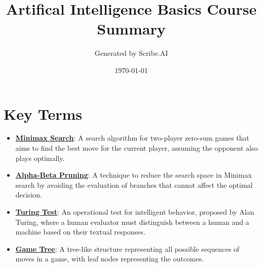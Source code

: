 \documentclass{article}%
\title{Artifical Intelligence Basics Course Summary}%
\author{Generated by Scribe.AI}%
\date{\today}%
\begin{document}
%
\normalsize%
\maketitle%
\section{Key Terms}%
\label{sec:KeyTerms}%
\begin{itemize}[leftmargin=*]%
\item \href{\url{https://purdue.brightspace.com/d2l/common/assets/pdfjs-d2l-dist/1.0.14-legacy/web/viewer.html?file=\%252Fcontent\%252Fenforced\%252F1095467-wl.202510.CS.24300.001\%252F02L2-Intro.pdf\%253Fou\%253D1095467\&lang=en-us\&container=d2l-fileviewer-rendered-pdf\&fullscreen=d2l-fileviewer-rendered-pdf-dialog\&height=667}#page=22}{\textbf{Minimax Search}}: A search algorithm for two-player zero-sum games that aims to find the best move for the current player, assuming the opponent also plays optimally.%
\item \href{\url{https://purdue.brightspace.com/d2l/common/assets/pdfjs-d2l-dist/1.0.14-legacy/web/viewer.html?file=\%252Fcontent\%252Fenforced\%252F1095467-wl.202510.CS.24300.001\%252F02L2-Intro.pdf\%253Fou\%253D1095467\&lang=en-us\&container=d2l-fileviewer-rendered-pdf\&fullscreen=d2l-fileviewer-rendered-pdf-dialog\&height=667}#page=23}{\textbf{Alpha{-}Beta Pruning}}: A technique to reduce the search space in Minimax search by avoiding the evaluation of branches that cannot affect the optimal decision.%
\item \href{\url{https://purdue.brightspace.com/d2l/common/assets/pdfjs-d2l-dist/1.0.14-legacy/web/viewer.html?file=\%252Fcontent\%252Fenforced\%252F1095467-wl.202510.CS.24300.001\%252F02L2-Intro.pdf\%253Fou\%253D1095467\&lang=en-us\&container=d2l-fileviewer-rendered-pdf\&fullscreen=d2l-fileviewer-rendered-pdf-dialog\&height=667}#page=6}{\textbf{Turing Test}}: An operational test for intelligent behavior, proposed by Alan Turing, where a human evaluator must distinguish between a human and a machine based on their textual responses.%
\item \href{\url{https://purdue.brightspace.com/d2l/common/assets/pdfjs-d2l-dist/1.0.14-legacy/web/viewer.html?file=\%252Fcontent\%252Fenforced\%252F1095467-wl.202510.CS.24300.001\%252F02L2-Intro.pdf\%253Fou\%253D1095467\&lang=en-us\&container=d2l-fileviewer-rendered-pdf\&fullscreen=d2l-fileviewer-rendered-pdf-dialog\&height=667}#page=11}{\textbf{Game Tree}}: A tree-like structure representing all possible sequences of moves in a game, with leaf nodes representing the outcomes.%

\end{itemize}
\end{document}
